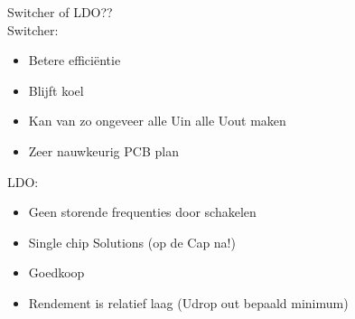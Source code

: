 \vspace{1cm}
Switcher of LDO??\\
Switcher:
\begin{itemize}
    \item Betere efficiëntie
    \item Blijft koel
    \item Kan van zo ongeveer alle Uin alle Uout maken
    \item Zeer nauwkeurig PCB plan
\end{itemize}
LDO:
\begin{itemize}
    \item Geen storende frequenties door schakelen
    \item Single chip Solutions (op de Cap na!)
    \item Goedkoop
    \item Rendement is relatief laag (Udrop out bepaald minimum)
\end{itemize}
